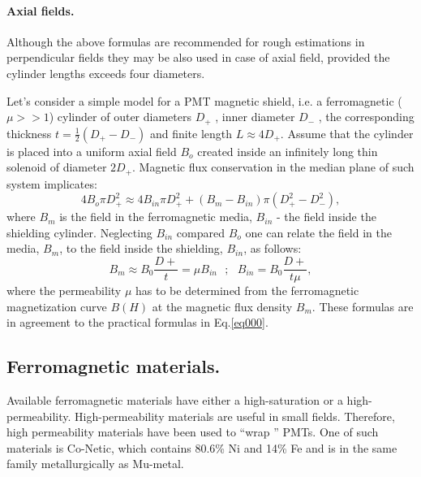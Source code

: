 \documentclass[12pt]{article}
\begin{document}
\paragraph{Axial fields.}
Although the above formulas are recommended  for rough estimations
in perpendicular fields they may be also used in case of  
axial field, provided the
cylinder lengths exceeds  four  diameters.



Let's consider a simple  model for a PMT  magnetic shield, 
i.e. a ferromagnetic ($\mu>>1$) cylinder of outer   diameters $D_+$ , inner diameter $D_-$ , the corresponding 
thickness $t=\frac{1}{2}(D_+-D_-)$ and finite length $L\approx 4D_+$.  Assume that the cylinder is  
placed into a uniform axial  field $B_o$ created
inside an infinitely long thin  solenoid of  diameter  $2D_+$.
Magnetic flux conservation in the median plane of  such system implicates:
\begin{equation}
4B_o \pi D_+^2 \approx 4B_{in} \pi D_+^2 + (B_m-B_{in}) \pi (D_+^2-D_-^2),
\label{eq004}
\end{equation}
where  $B_m$ is the  field in the ferromagnetic media, $B_{in}$ - the field  inside  the shielding cylinder.
Neglecting $B_{in}$ compared $B_o$ one can relate   the field in the media, $B_m$, to the field inside the 
shielding, $B_{in}$, as follows:
 \begin{equation}
B_m  \approx B_0\frac{D+}{t}=\mu B_{in}~~~;~~~B_{in}= B_0\frac{D+}{t\mu},
\label{eq003}
\end{equation}
where the permeability $\mu$  has to be determined  from the ferromagnetic  magnetization curve $B(H)$ at
the  magnetic flux density  $B_m$. 
These formulas  are  in agreement to the practical  formulas in Eq.\ref{eq000}.






\subsection{Ferromagnetic materials.}
Available ferromagnetic materials have either a high-saturation or a high-permeability. 
High-permeability materials are useful in small fields.
Therefore,  high permeability materials have been used to ``wrap '' PMTs.  
One of such materials is Co-Netic, which contains 80.6\% Ni and 14\% Fe and is in the 
same family metallurgically as Mu-metal. 
 
\end{document}
